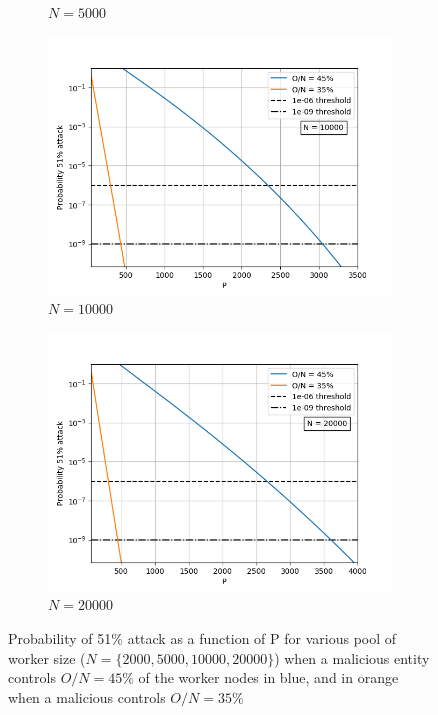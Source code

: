 \begin{figure}[H]
\begin{subfigure}[b]{0.45\textwidth}
        \renewcommand{\thesubfigure}{b}
        \caption{$N = 5000$}
        \label{fig:N5000}
    \end{subfigure}
        \begin{subfigure}[b]{0.45\textwidth}
        \includegraphics[width=\textwidth]{Figures/Prob51_vs_P_N10000_O35_to_45}
   
        \renewcommand{\thesubfigure}{c}
        \caption{$N = 10000$}
        \label{fig:N10000}
    \end{subfigure}
        \begin{subfigure}[b]{0.45\textwidth}
        \includegraphics[width=\textwidth]{Figures/Prob51_vs_P_N20000_O35_to_45}
   
        \renewcommand{\thesubfigure}{d}
        \caption{$N = 20000$}
        \label{fig:N=20000}
    \end{subfigure}
\caption{Probability of 51\% attack as a function of P for various pool of worker size ($N=\{2000, 5000, 10000, 20000\}$) when a malicious entity controls $O/N = 45\%$ of the worker nodes in blue, and in orange when a malicious controls $O/N = 35\%$}\label{fig:P}
\end{figure}    

